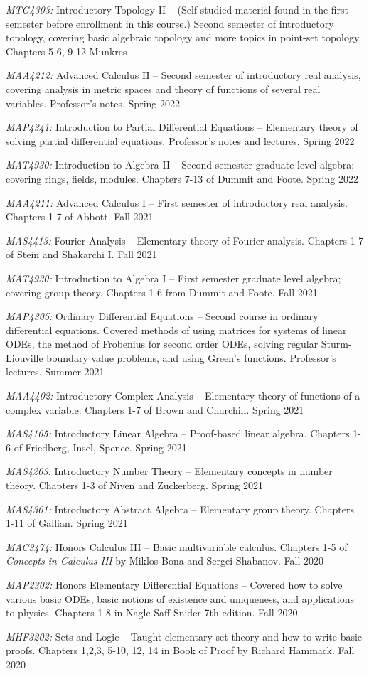 \documentclass[11pt]{article}
\begin{document}
\textsl{MTG4303\textsuperscript{\textdagger}:} Introductory Topology II -- (Self-studied material found in the first semester before enrollment in this course.) Second semester of introductory topology, covering basic algebraic topology and more topics in point-set topology. Chapters 5-6, 9-12 Munkres

\textsl{MAA4212:} Advanced Calculus II -- Second semester of introductory real analysis, covering analysis in metric spaces and theory of functions of several real variables. Professor's notes. Spring 2022

\textsl{MAP4341\textsuperscript{\textdagger}:} Introduction to Partial Differential Equations -- Elementary theory of solving partial differential equations. Professor's notes and lectures. Spring 2022

\textsl{MAT4930\textsuperscript{\textdagger}:} Introduction to Algebra II -- Second semester graduate level algebra; covering rings, fields, modules. Chapters 7-13 of Dummit and Foote. Spring 2022

\textsl{MAA4211:} Advanced Calculus I -- First semester of introductory real analysis. Chapters 1-7 of Abbott. Fall 2021

\textsl{MAS4413:} Fourier Analysis -- Elementary theory of Fourier analysis. Chapters 1-7 of Stein and Shakarchi I. Fall 2021

\textsl{MAT4930\textsuperscript{\textdagger}:} Introduction to Algebra I -- First semester graduate level algebra; covering group theory. Chapters 1-6 from Dummit and Foote. Fall 2021

\textsl{MAP4305:} Ordinary Differential Equations -- Second course in ordinary differential equations. Covered methods of using matrices for systems of linear ODEs, the method of Frobenius for second order ODEs, solving regular Sturm-Liouville boundary value problems, and using Green's functions. Professor's lectures. Summer 2021

\textsl{MAA4402:} Introductory Complex Analysis -- Elementary theory of functions of a complex variable. Chapters 1-7 of Brown and Churchill. Spring 2021

\textsl{MAS4105:} Introductory Linear Algebra -- Proof-based linear algebra. Chapters 1-6 of Friedberg, Insel, Spence. Spring 2021

\textsl{MAS4203:} Introductory Number Theory -- Elementary concepts in number theory. Chapters 1-3 of Niven and Zuckerberg. Spring 2021

\textsl{MAS4301:} Introductory Abstract Algebra -- Elementary group theory. Chapters 1-11 of Gallian. Spring 2021

\textsl{MAC3474:} Honors Calculus III -- Basic multivariable calculus. Chapters 1-5 of \textsl{Concepts in Calculus III} by Miklos Bona and Sergei Shabanov. Fall 2020

\textsl{MAP2302:} Honors Elementary Differential Equations -- Covered how to solve various basic ODEs, basic notions of existence and uniqueness, and applications to physics. Chapters 1-8 in Nagle Saff Snider 7th edition. Fall 2020

\textsl{MHF3202:} Sets and Logic -- Taught elementary set theory and how to write basic proofs. Chapters 1,2,3, 5-10, 12, 14 in Book of Proof by Richard Hammack. Fall 2020
\end{document}
